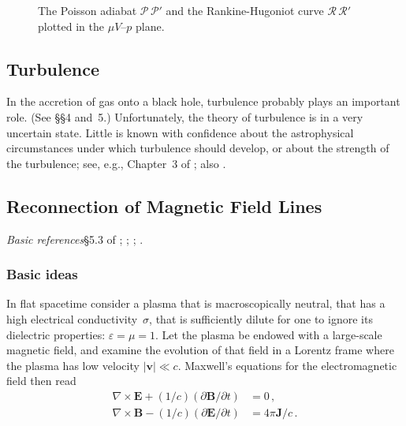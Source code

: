 \begin{figure}[htbp]
\centering
{}
\caption{The Poisson adiabat $\mathscr{P}\,\mathscr{P}'$ and the
  Rankine-Hugoniot curve $\mathscr{R}\,\mathscr{R}'$ plotted in the
  $\mu V$--$p$ plane.}
\label{fig:2.7.2}
\end{figure}



\subsection{Turbulence}
\label{sec:2.8}

In the accretion of gas onto a black hole, turbulence probably plays an
important role.  (See \S\S4 and~5.)  Unfortunately, the theory of turbulence
is in a very uncertain state.  Little is known with confidence about the
astrophysical circumstances under which turbulence should develop, or about
the strength of the turbulence; see, e.g., Chapter~3 of
\citet{LandauLifshitz1959}; also \citet{Pikelner1961}.



\subsection{Reconnection of Magnetic Field Lines}
\label{sec:2.9}

\emph{Basic references}\quad \S5.3 of \citet{Cowling1965};
\citet{Sonnerup1970}; \citet{Yeh1970};
\citet{VainshteinZeldovich1972}.

\subsubsection*{Basic ideas}

In flat spacetime consider a plasma that is macroscopically neutral, that has a
high electrical conductivity~$\sigma$, that is sufficiently dilute for one to
ignore its dielectric properties: $\varepsilon = \mu = 1$.  Let the plasma be
endowed with a large-scale magnetic field, and examine the evolution of that
field in a Lorentz frame where the plasma has low velocity
$|\mathbf{v}| \ll c$.  Maxwell's equations for the electromagnetic field then
read
%
\begin{align}
  \nabla \times \mathbf{E} + (1/c)(\partial\mathbf{B}/\partial t) &= 0\,,
  \tag{2.9.1} \\[4pt]
  \nabla \times \mathbf{B} - (1/c)(\partial\mathbf{E}/\partial t)
    &= 4\pi\mathbf{J}/c\,.
  \tag{2.9.2}
\end{align}


